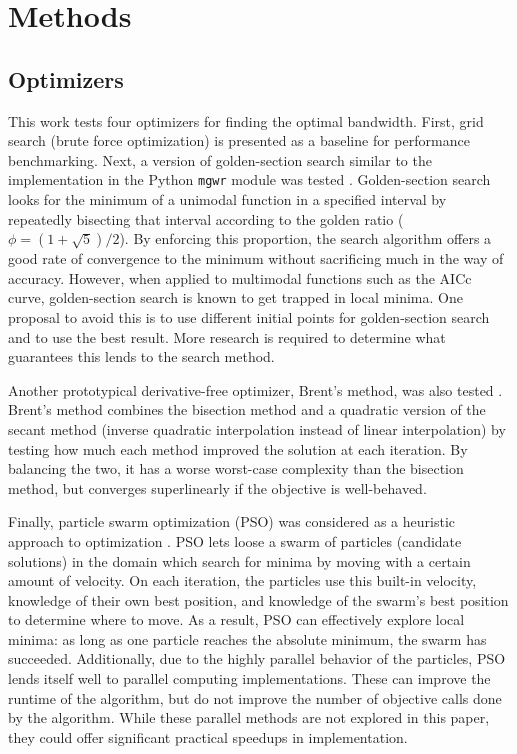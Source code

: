 \documentclass[letterpaper,12pt,twocolumn]{article}
\begin{document}
\section{Methods}
\label{sec:methods}
\subsection{Optimizers}
This work tests four optimizers for finding the optimal bandwidth. First, grid search (brute force optimization) is presented as a baseline for performance benchmarking. Next, a version of golden-section search \cite{Kiefer1953} similar to the implementation in the Python \texttt{mgwr} module was tested \cite{Oshan2019}. Golden-section search looks for the minimum of a unimodal function in a specified interval by repeatedly bisecting that interval according to the golden ratio ($\phi = (1 + \sqrt{5})/2$). By enforcing this proportion, the search algorithm offers a good rate of convergence to the minimum without sacrificing much in the way of accuracy. However, when applied to multimodal functions such as the AICc curve, golden-section search is known to get trapped in local minima. One proposal to avoid this is to use different initial points for golden-section search and to use the best result. More research is required to determine what guarantees this lends to the search method.

Another prototypical derivative-free optimizer, Brent's method, was also tested \cite{Brent1973}. Brent's method combines the bisection method and a quadratic version of the secant method (inverse quadratic interpolation instead of linear interpolation) by testing how much each method improved the solution at each iteration. By balancing the two, it has a worse worst-case complexity than the bisection method, but converges superlinearly if the objective is well-behaved.

Finally, particle swarm optimization (PSO) was considered as a heuristic approach to optimization \cite{Bonyadi2017}. PSO lets loose a swarm of particles (candidate solutions) in the domain which search for minima by moving with a certain amount of velocity. On each iteration, the particles use this built-in velocity, knowledge of their own best position, and knowledge of the swarm's best position to determine where to move. As a result, PSO can effectively explore local minima: as long as one particle reaches the absolute minimum, the swarm has succeeded. Additionally, due to the highly parallel behavior of the particles, PSO lends itself well to parallel computing implementations. These can improve the runtime of the algorithm, but do not improve the number of objective calls done by the algorithm. While these parallel methods are not explored in this paper, they could offer significant practical speedups in implementation.
\end{document}
